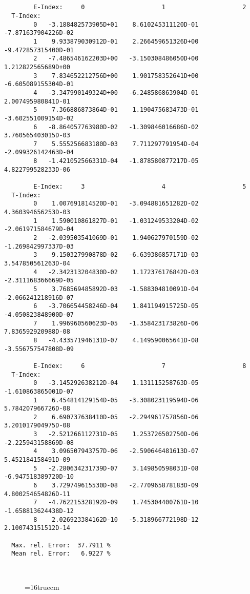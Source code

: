 \documentclass[12pt]{article}
\begin{document}
\begin{small}\begin{verbatim}


        E-Index:     0                     1                     2
  T-Index:
        0   -3.188482573905D+01    8.610245311120D-01   -7.871637904226D-02
        1    9.933879030912D-01    2.266459651326D+00   -9.472857315400D-01
        2   -7.486546162203D+00   -3.150308486050D+00    1.212822565689D+00
        3    7.834652212756D+00    1.901758352641D+00   -6.605089155304D-01
        4   -3.347990149324D+00   -6.248586863904D-01    2.007495980841D-01
        5    7.366886873864D-01    1.190475683473D-01   -3.602551009154D-02
        6   -8.864057763980D-02   -1.309846016686D-02    3.760565403015D-03
        7    5.555256683180D-03    7.711297791954D-04   -2.099326142463D-04
        8   -1.421052566331D-04   -1.878580877217D-05    4.822799528233D-06

        E-Index:     3                     4                     5
  T-Index:
        0    1.007691814520D-01   -3.094881651282D-02    4.360394656253D-03
        1    1.590010861827D-01   -1.031249533204D-02   -2.061971584679D-04
        2   -2.039503541069D-01    1.940627970159D-02   -1.269842997337D-03
        3    9.150327990878D-02   -6.639386857171D-03    3.547850561263D-04
        4   -2.342313204830D-02    1.172376176842D-03   -2.311168366669D-05
        5    3.768569485892D-03   -1.588304810091D-04   -2.066241218916D-07
        6   -3.706654458246D-04    1.841194915725D-05   -4.050823848900D-07
        7    1.996960560623D-05   -1.358423173826D-06    7.836592920988D-08
        8   -4.433571946131D-07    4.149590065641D-08   -3.556757547808D-09

        E-Index:     6                     7                     8
  T-Index:
        0   -3.145292638212D-04    1.131115258763D-05   -1.610863865001D-07
        1    6.454814129154D-05   -3.308023119594D-06    5.784207966726D-08
        2    6.690737638410D-05   -2.294961757856D-06    3.201017904975D-08
        3   -2.521266112731D-05    1.253726502750D-06   -2.225943158869D-08
        4    3.096507943757D-06   -2.590646481613D-07    5.452184158491D-09
        5   -2.280634231739D-07    3.149850598031D-08   -6.947518389720D-10
        6    3.729749615530D-08   -2.770965878183D-09    4.800254654826D-11
        7   -4.762215328192D-09    1.745304400761D-10   -1.658813624438D-12
        8    2.026923384162D-10   -5.318966772198D-12    2.100743151512D-14

  Max. rel. Error:  37.7911 %
  Mean rel. Error:   6.9227 %



\end{verbatim}\end{small}
\begin{figure} \label{2.3.2e}
\epsfxsize=16truecm
\end{figure}
\newpage
\end{document}
